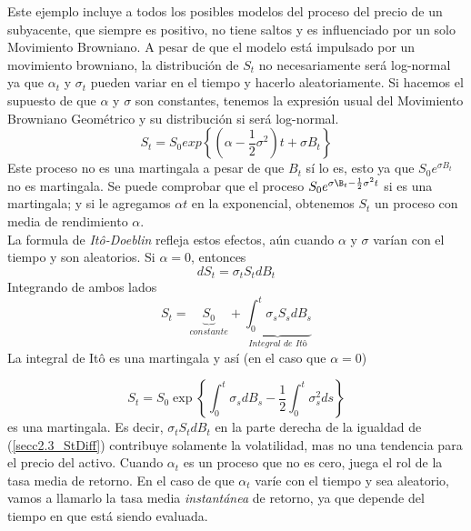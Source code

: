 \documentclass[11pt,notitlepage]{article}
\begin{document}
Este ejemplo incluye a todos los posibles modelos del proceso del precio de un subyacente, que siempre es positivo, no tiene saltos y es influenciado por un solo Movimiento Browniano. A pesar de que el modelo está impulsado por un movimiento browniano, la distribución de $S_{t}$ no necesariamente será log-normal ya que $\alpha_{t}$ y $\sigma_{t}$ pueden variar en el tiempo y hacerlo aleatoriamente. Si hacemos el supuesto de que $\alpha$ y $\sigma$ son constantes, tenemos la expresión usual del Movimiento Browniano Geométrico y su distribución si será log-normal.
\begin{equation}\label{secc2.3_movbrwgeometrico}
    S_{t}=S_{0}exp \left \{\left (\alpha-\frac{1}{2}\sigma^{2}  \right )t+\sigma B_{t}\right \}
\end{equation} 
Este proceso no es una martingala a pesar de que $B_{t}$ sí lo es, esto ya que $S_{0}e^{\sigma B_{t}}$ no es martingala. Se puede comprobar que el proceso $S_{0}e^{\sigma \B_{t}-\frac{1}{2}\sigma^{2}t}$ si es una martingala; y si le agregamos $\alpha t$ en la exponencial, obtenemos $S_{t}$ un proceso con media de rendimiento $\alpha$.\\
La formula de \textit{Itô-Doeblin} refleja estos efectos, aún cuando $\alpha$ y $\sigma$ varían con el tiempo y son aleatorios. Si $\alpha=0$, entonces 
 \begin{equation}
     dS_{t}=\sigma_{t}S_{t}dB_{t}
 \end{equation}
Integrando de ambos lados
\begin{equation*}
    S_{t}=\underbrace{S_{0}}_{constante}+\underbrace{\int_{0}^{t}\sigma_{s}S_{s}dB_{s}}_{\textit{Integral de Itô}}
\end{equation*}
La integral de Itô es una martingala y así (en el caso que $\alpha=0$)

\begin{equation}\label{secc2.3_Stmartingala}
    S_{t}=S_{0}\exp\left \{ \int_{0}^{t}\sigma_{s}dB_{s}-\frac{1}{2}\int_{0}^{t}\sigma^{2}_{s}ds \right \}
\end{equation}
es una martingala. Es decir, $\sigma_{t}S_{t}dB_{t}$ en la parte derecha de la igualdad de (\ref{secc2.3_StDiff}) contribuye solamente la volatilidad, mas no una tendencia para el precio del activo. Cuando $\alpha_{t}$ es un proceso que no es cero, juega el rol de la tasa media de retorno. En el caso de que $\alpha_{t}$ varíe con el tiempo y sea aleatorio, vamos a llamarlo la tasa media \textit{instantánea} de retorno, ya que depende del tiempo en que está siendo evaluada.\\
\end{document}
